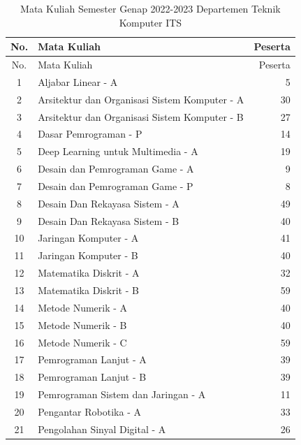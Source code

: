 \begin{longtable}{|c|l|r|}
  \caption{Mata Kuliah Semester Genap 2022-2023 \linebreak Departemen Teknik Komputer ITS}
  \label{tb:matkul}\\
  \hline
  \rowcolor[HTML]{D0CECE} 
  No. & Mata Kuliah & Peserta \\ \hline
  \endfirsthead
  \hline
  \rowcolor[HTML]{D0CECE} 
  No. & Mata Kuliah & Peserta \\ \hline
  \endhead
  1  & Aljabar Linear - A                            & 5  \\
  2  & Arsitektur dan Organisasi Sistem Komputer - A & 30 \\
  3  & Arsitektur dan Organisasi Sistem Komputer - B & 27 \\
  4  & Dasar Pemrograman - P                         & 14 \\
  5  & Deep Learning untuk Multimedia - A            & 19 \\
  6  & Desain dan Pemrograman Game - A               & 9  \\
  7  & Desain dan Pemrograman Game - P               & 8  \\
  8  & Desain Dan Rekayasa Sistem - A                & 49 \\
  9  & Desain Dan Rekayasa Sistem - B                & 40 \\
  10 & Jaringan Komputer - A                         & 41 \\
  11 & Jaringan Komputer - B                         & 40 \\
  12 & Matematika Diskrit - A                        & 32 \\
  13 & Matematika Diskrit - B                        & 59 \\
  14 & Metode Numerik - A                            & 40 \\
  15 & Metode Numerik - B                            & 40 \\
  16 & Metode Numerik - C                            & 59 \\
  17 & Pemrograman Lanjut - A                        & 39 \\
  18 & Pemrograman Lanjut - B                        & 39 \\
  19 & Pemrograman Sistem dan Jaringan - A           & 11 \\
  20 & Pengantar Robotika - A                        & 33 \\
  21 & Pengolahan Sinyal Digital - A                 & 26 \\

\end{longtable}
